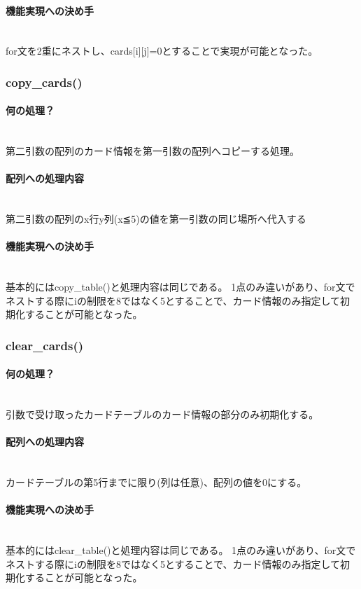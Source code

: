 \documentclass[11pt,a4paper, uplatex]{jsarticle}
\begin{document}
\paragraph{機能実現への決め手}\mbox{}\\
for文を2重にネストし、cards[i][j]=0とすることで実現が可能となった。
%
\subsubsection{copy\_cards()}
\paragraph{何の処理？}\mbox{}\\
第二引数の配列のカード情報を第一引数の配列へコピーする処理。
\paragraph{配列への処理内容}\mbox{}\\
第二引数の配列のx行y列(x≦5)の値を第一引数の同じ場所へ代入する
\paragraph{機能実現への決め手}\mbox{}\\
基本的にはcopy\_table()と処理内容は同じである。
1点のみ違いがあり、for文でネストする際にiの制限を8ではなく5とすることで、カード情報のみ指定して初期化することが可能となった。
%
\subsubsection{clear\_cards()}
\paragraph{何の処理？}\mbox{}\\
引数で受け取ったカードテーブルのカード情報の部分のみ初期化する。
\paragraph{配列への処理内容}\mbox{}\\
カードテーブルの第5行までに限り(列は任意)、配列の値を0にする。
\paragraph{機能実現への決め手}\mbox{}\\
基本的にはclear\_table()と処理内容は同じである。
1点のみ違いがあり、for文でネストする際にiの制限を8ではなく5とすることで、カード情報のみ指定して初期化することが可能となった。
%
\end{document}
